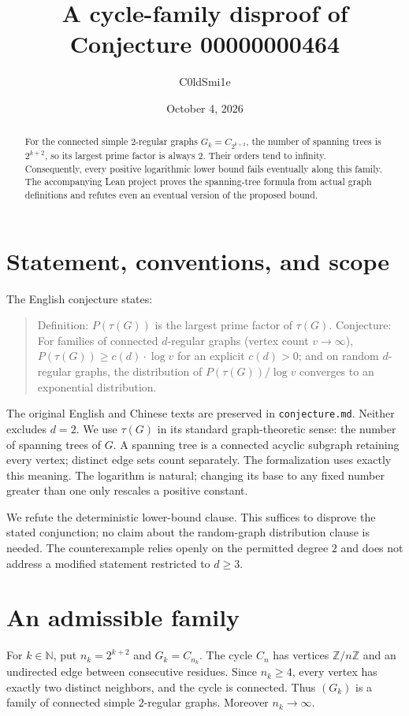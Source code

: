 \documentclass[11pt]{article}
\title{A cycle-family disproof of Conjecture 00000000464}
\author{C0ldSmi1e}
\date{October 4, 2026}
\newcommand{\N}{\mathbb N}
\begin{document}
\maketitle
\begin{abstract}
For the connected simple $2$-regular graphs $G_k=C_{2^{k+2}}$, the number of spanning trees is $2^{k+2}$, so its largest prime factor is always $2$. Their orders tend to infinity. Consequently, every positive logarithmic lower bound fails eventually along this family. The accompanying Lean project proves the spanning-tree formula from actual graph definitions and refutes even an eventual version of the proposed bound.
\end{abstract}

\section{Statement, conventions, and scope}
The English conjecture states:
\begin{quote}
Definition: $P(\tau(G))$ is the largest prime factor of $\tau(G)$. Conjecture: For families of connected $d$-regular graphs (vertex count $v\to\infty$), $P(\tau(G))\ge c(d)\cdot\log v$ for an explicit $c(d)>0$; and on random $d$-regular graphs, the distribution of $P(\tau(G))/\log v$ converges to an exponential distribution.
\end{quote}
The original English and Chinese texts are preserved in \texttt{conjecture.md}. Neither excludes $d=2$. We use $\tau(G)$ in its standard graph-theoretic sense: the number of spanning trees of $G$. A spanning tree is a connected acyclic subgraph retaining every vertex; distinct edge sets count separately. The formalization uses exactly this meaning. The logarithm is natural; changing its base to any fixed number greater than one only rescales a positive constant.

We refute the deterministic lower-bound clause. This suffices to disprove the stated conjunction; no claim about the random-graph distribution clause is needed. The counterexample relies openly on the permitted degree $2$ and does not address a modified statement restricted to $d\ge3$.

\section{An admissible family}
For $k\in\N$, put $n_k=2^{k+2}$ and $G_k=C_{n_k}$. The cycle $C_n$ has vertices $\mathbb Z/n\mathbb Z$ and an undirected edge between consecutive residues. Since $n_k\ge4$, every vertex has exactly two distinct neighbors, and the cycle is connected. Thus $(G_k)$ is a family of connected simple $2$-regular graphs. Moreover $n_k\to\infty$.
\end{document}
